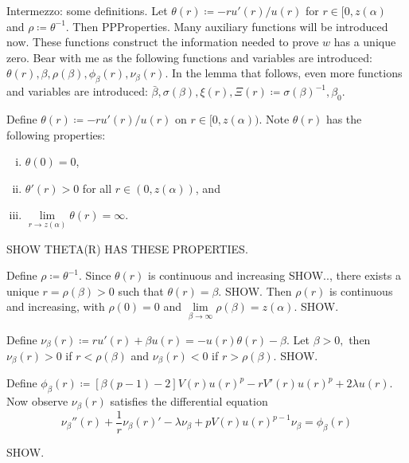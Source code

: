 {\color{gray} Intermezzo: some definitions. Let $\theta(r)\coloneqq-ru'(r)/u(r)$ for $r\in[0,z(\alpha)$ and $\rho\coloneqq\theta^{-1}$. Then PPProperties. Many auxiliary functions will be introduced now. These functions construct the information needed to prove $w$ has a unique zero. Bear with me as the following functions and variables are introduced: $\theta(r),\beta,\rho(\beta),\phi_{\beta}(r),\nu_{\beta}(r)$. In the lemma that follows, even more functions and variables are introduced: $\bar\beta,\sigma(\beta),\xi(r), \Xi(r)\coloneqq\sigma(\beta)^{-1},\beta_0$.}

{\color{teal}Define $\theta(r)\coloneqq-ru'(r)/u(r)$ on $r\in[0,z(\alpha))$. Note $\theta(r)$ has the following properties: \begin{enumerate}[(i)]\item $\theta(0)=0$, \item $\theta'(r)>0$ for all $r\in(0,z(\alpha))$, and \item $\underset{r\to z(\alpha)}{\lim}\theta(r)=\infty$. \end{enumerate} SHOW THETA(R) HAS THESE PROPERTIES.

Define $\rho\coloneqq\theta^{-1}$. Since $\theta(r)$ is continuous and increasing SHOW.., there exists a unique $r=\rho(\beta)>0$ such that $\theta(r)=\beta$. SHOW. Then $\rho(r)$ is continuous and increasing, with $\rho(0)=0$ and $\underset{\beta\to\infty}{\lim}\rho(\beta)=z(\alpha).$ SHOW.

Define $\nu_{\beta}(r)\coloneqq ru'(r)+\beta u(r)=-u(r){\theta(r)-\beta}.$ Let $\beta>0,$ then $\nu_{\beta}(r)>0$ if $r<\rho(\beta)$ and $\nu_{\beta}(r)<0$ if $r>\rho(\beta)$. SHOW.

Define $\phi_{\beta}(r)\coloneqq\left[\beta(p-1)-2\right]V(r)u(r)^p-rV'(r)u(r)^p+2\lambda u(r).$ Now observe $\nu_{\beta}(r)$ satisfies the differential equation $$\nu_{\beta}''(r)+\frac{1}{r}\nu_{\beta}(r)'-\lambda\nu_{\beta}+pV(r)u(r)^{p-1}\nu_{\beta}=\phi_{\beta}(r)$$} SHOW.